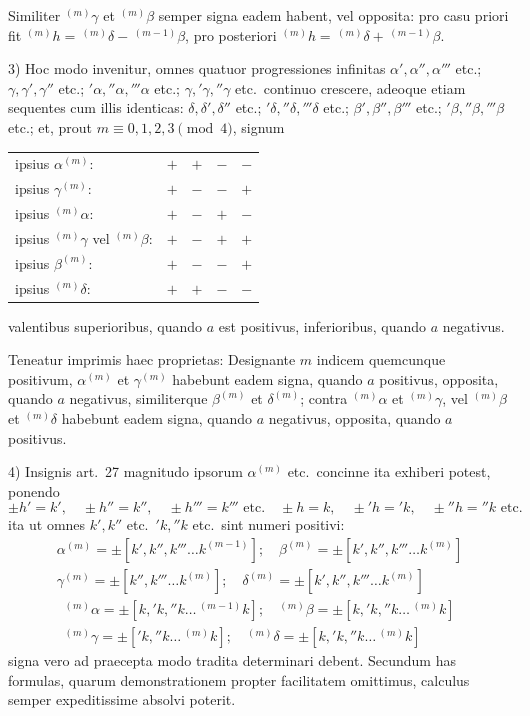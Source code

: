 \documentclass[12pt,a4paper]{article}
\theoremstyle{plain}
\theoremstyle{definition}
\theoremstyle{remark}
\begin{document}
Similiter $^{(m)}\gamma$ et $^{(m)}\beta$ semper signa eadem habent, vel opposita: pro casu priori fit $^{(m)}h=\,^{(m)}\delta-\,^{(m-1)}\beta$, pro posteriori $^{(m)}h=\,^{(m)}\delta+\,^{(m-1)}\beta$.

3) Hoc modo invenitur, omnes quatuor progressiones infinitas $\alpha',\alpha'',\alpha'''$ etc.; $\gamma,\gamma',\gamma''$ etc.; $'\alpha,''\alpha,'''\alpha$ etc.; $\gamma,'\gamma,''\gamma$ etc.\ continuo crescere, adeoque etiam sequentes cum illis identicas: $\delta,\delta',\delta''$ etc.; $'\delta,''\delta,'''\delta$ etc.; $\beta',\beta'',\beta'''$ etc.; $'\beta,''\beta,'''\beta$ etc.; et, prout $m\equiv 0,1,2,3\pmod{4}$, signum
\begin{center}
\begin{tabular}{lcccc}
ipsius $\alpha^{(m)}$: & $+$ & $+$ & $-$ & $-$ \\
ipsius $\gamma^{(m)}$: & $+$ & $-$ & $-$ & $+$ \\
ipsius $^{(m)}\alpha$: & $+$ & $-$ & $+$ & $-$ \\
ipsius $^{(m)}\gamma$ vel $^{(m)}\beta$: & $+$ & $-$ & $+$ & $+$ \\
ipsius $\beta^{(m)}$: & $+$ & $-$ & $-$ & $+$ \\
ipsius $^{(m)}\delta$: & $+$ & $+$ & $-$ & $-$ \\
\end{tabular}
\end{center}
valentibus superioribus, quando $a$ est positivus, inferioribus, quando $a$ negativus.

Teneatur imprimis haec proprietas: Designante $m$ indicem quemcunque positivum, $\alpha^{(m)}$ et $\gamma^{(m)}$ habebunt eadem signa, quando $a$ positivus, opposita, quando $a$ negativus, similiterque $\beta^{(m)}$ et $\delta^{(m)}$; contra $^{(m)}\alpha$ et $^{(m)}\gamma$, vel $^{(m)}\beta$ et $^{(m)}\delta$ habebunt eadem signa, quando $a$ negativus, opposita, quando $a$ positivus.

4) Insignis art.\ 27 magnitudo ipsorum $\alpha^{(m)}$ etc.\ concinne ita exhiberi potest, ponendo
\[\pm h'=k',\quad \pm h''=k'',\quad \pm h'''=k'''\text{ etc.}\quad \pm h=k,\quad \pm 'h='k,\quad \pm ''h=''k\text{ etc.}\]
ita ut omnes $k',k''$ etc.\ $'k,''k$ etc.\ sint numeri positivi:
\begin{gather*}
\alpha^{(m)}=\pm[k',k'',k'''\ldots k^{(m-1)}];\quad \beta^{(m)}=\pm[k',k'',k'''\ldots k^{(m)}]\\
\gamma^{(m)}=\pm[k'',k'''\ldots k^{(m)}];\quad \delta^{(m)}=\pm[k',k'',k'''\ldots k^{(m)}]
\end{gather*}
\begin{gather*}
^{(m)}\alpha=\pm[k,'k,''k\ldots\,^{(m-1)}k];\quad ^{(m)}\beta=\pm[k,'k,''k\ldots\,^{(m)}k]\\
^{(m)}\gamma=\pm['k,''k\ldots\,^{(m)}k];\quad ^{(m)}\delta=\pm[k,'k,''k\ldots\,^{(m)}k]
\end{gather*}
signa vero ad praecepta modo tradita determinari debent. Secundum has formulas, quarum demonstrationem propter facilitatem omittimus, calculus semper expeditissime absolvi poterit.
\end{document}
